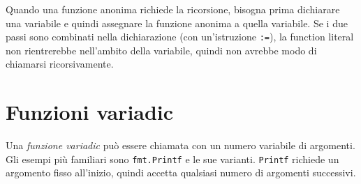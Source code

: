 Quando una funzione anonima richiede la ricorsione, bisogna prima dichiarare una variabile e quindi assegnare la funzione anonima a quella variabile.
Se i due passi sono combinati nella dichiarazione (con un'istruzione \verb|:=|), la function literal non rientrerebbe nell'ambito della variabile, quindi non avrebbe modo di chiamarsi ricorsivamente.


\section{Funzioni variadic}
\label{sec:funzioni_variadic}%
Una \textit{funzione variadic} può essere chiamata con un numero variabile di argomenti.
Gli esempi più familiari sono \verb|fmt.Printf| e le sue varianti.
\verb|Printf| richiede un argomento fisso all'inizio, quindi accetta qualsiasi numero di argomenti successivi.

